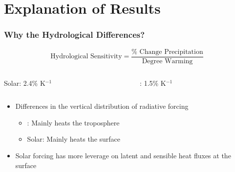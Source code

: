 \documentclass{beamer}
\begin{document}

\section{Explanation of Results}
\begin{frame}
\frametitle{Why the Hydrological Differences?}
\begin{equation*}
	\text{Hydrological Sensitivity} = \frac{\%\text{ Change Precipitation}}{\text{Degree Warming}}
\end{equation*}
\begin{columns}
\begin{column}{6cm}
	\centering Solar: 2.4\% K$^{-1}$
\end{column}
\begin{column}{6cm}
	\centering {}: 1.5\% K$^{-1}$
\end{column}
\end{columns}
\vspace{0.5cm}
	\begin{itemize}
		\item Differences in the vertical distribution of radiative forcing
		\begin{itemize}
		\item {}: Mainly heats the troposphere
		\item Solar: Mainly heats the surface
		\end{itemize}
		\item Solar forcing has more leverage on latent and sensible heat fluxes at the surface\\
	\end{itemize}
\end{frame}
\end{document}
